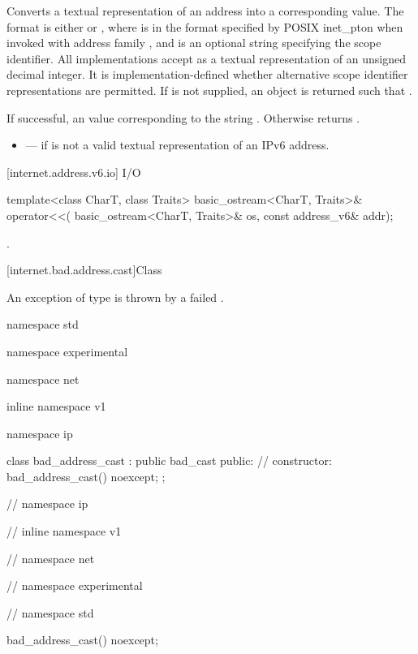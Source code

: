 \begin{itemdescr}
\pnum
\effects Converts a textual representation of an address into a corresponding  value. The format is either  or \tcode{\%}, where  is in the format specified by POSIX inet_pton when invoked with address family , and  is an optional string specifying the scope identifier. All implementations accept as  a textual representation of an unsigned decimal integer. It is implementation-defined whether alternative scope identifier representations are permitted. If  is not supplied, an  object is returned such that .

\pnum
\returns If successful, an  value corresponding to the string . Otherwise returns .

\pnum
\errors
\begin{itemize}
\item
{} --- if  is not a valid textual representation of an IPv6 address.
\end{itemize}
\end{itemdescr}



[internet.address.v6.io]{ I/O}

\begin{itemdecl}
template<class CharT, class Traits>
  basic_ostream<CharT, Traits>& operator<<(
    basic_ostream<CharT, Traits>& os, const address_v6& addr);
\end{itemdecl}

\begin{itemdescr}
\pnum
\returns {}.
\end{itemdescr}




[internet.bad.address.cast]{Class }

\pnum
An exception of type  is thrown by a failed .

\begin{itemdecl}
namespace std {
namespace experimental {
namespace net {
inline namespace v1 {
namespace ip {

  class bad_address_cast : public bad_cast
  {
  public:
    // constructor:
    bad_address_cast() noexcept;
  };

} // namespace ip
} // inline namespace v1
} // namespace net
} // namespace experimental
} // namespace std

bad_address_cast() noexcept;
\end{itemdecl}

